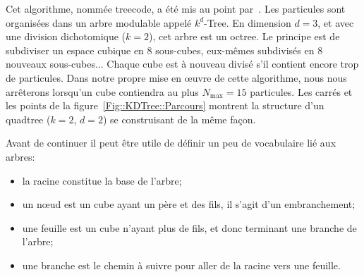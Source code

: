 
			Cet algorithme, nommée \og treecode\fg, a été mis au point par~\cite{1986Natur.324..446B}.
			Les particules sont
			organisées dans un arbre modulable appelé $k^d$-Tree. En dimension $d=3$, et avec une division dichotomique
			($k=2$), cet arbre est un octree. Le principe est de subdiviser un espace cubique en 8 sous-cubes, eux-mêmes subdivisés en 8
			nouveaux sous-cubes... Chaque cube est à nouveau divisé s'il contient encore trop de particules.
			Dans notre propre mise en œuvre de cette algorithme,
			nous nous arrêterons lorsqu'un cube contiendra au plus $N_\mathrm{max}=15$ particules. Les carrés et les points
			de la figure~\ref{Fig::KDTree::Parcours} montrent la structure d'un quadtree ($k=2$, $d=2$) se construisant de la même façon.

			Avant de continuer il peut être utile de définir un peu de vocabulaire lié aux arbres:
			\begin{itemize}
				\item la racine constitue la base de l'arbre;
				\item un nœud est un cube ayant un père et des fils, il s'agit d'un embranchement;
				\item une feuille est un cube n'ayant plus de fils, et donc terminant une branche de
					l'arbre;
				\item une branche est le chemin à suivre pour aller de la racine vers une feuille.
			\end{itemize}


